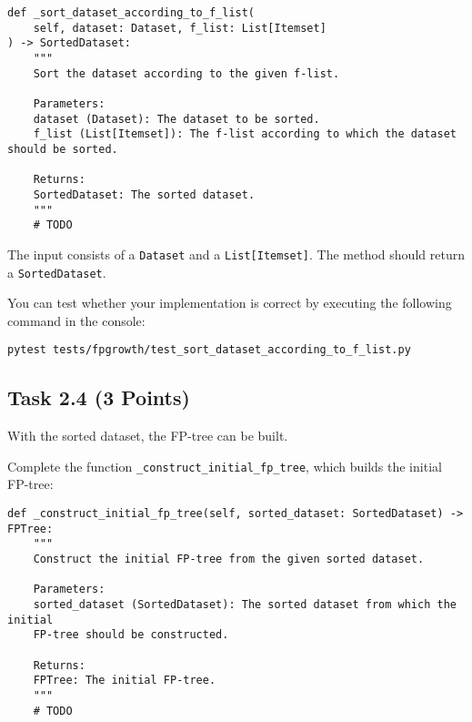 \documentclass[
english,
smallborders
]{i6prcsht}
\newcommand{\points}[1]{\hfill \color{red}(#1 Points)\color{black}}
\begin{document}
\vspace*{0.3cm}

\begin{lstlisting}
def _sort_dataset_according_to_f_list(
	self, dataset: Dataset, f_list: List[Itemset]
) -> SortedDataset:
	"""
	Sort the dataset according to the given f-list.

	Parameters:
	dataset (Dataset): The dataset to be sorted.
	f_list (List[Itemset]): The f-list according to which the dataset should be sorted.

	Returns:
	SortedDataset: The sorted dataset.
	"""
	# TODO
\end{lstlisting}

\vspace*{0.1cm}

The input consists of a \texttt{Dataset} and a \texttt{List[Itemset]}. The method should return a \texttt{SortedDataset}.

You can test whether your implementation is correct by executing the following command in the console:

\vspace*{0.3cm}

\begin{lstlisting}
pytest tests/fpgrowth/test_sort_dataset_according_to_f_list.py
\end{lstlisting}

\vspace*{0.1cm}


\subsection*{Task 2.4 \points{3}}

With the sorted dataset, the FP-tree can be built.

Complete the function \texttt{\_construct\_initial\_fp\_tree}, which builds the
initial FP-tree:

\vspace*{0.3cm}

\begin{lstlisting}
def _construct_initial_fp_tree(self, sorted_dataset: SortedDataset) -> FPTree:
	"""
	Construct the initial FP-tree from the given sorted dataset.

	Parameters:
	sorted_dataset (SortedDataset): The sorted dataset from which the initial
	FP-tree should be constructed.

	Returns:
	FPTree: The initial FP-tree.
	"""
	# TODO
\end{lstlisting}
\end{document}
